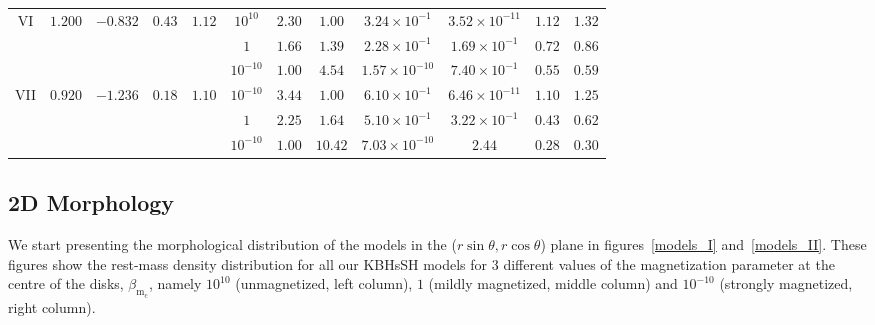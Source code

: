 \documentclass[twocolumn,aps,showpacs,showkeys,prd,superscriptaddress,byrevtex, amsmath]{revtex4-1}
\begin{document}
\begin{table}[t]
\begin{tabular}{c c c c c  c c c c c c c}
VI & $1.200$ & $-0.832$ & $0.43$ & $1.12$ & $10^{10}$ & $2.30$ & $1.00$ & $3.24 \times 10^{-1}$ & $3.52 \times 10^{-11}$ & $1.12$ & $1.32$ \\ 

 &  &  &  &  & $1$ & $1.66$ & $1.39$ & $2.28 \times 10^{-1}$ & $1.69\times 10^{-1}$ & $0.72$ & $0.86$ \\ 

 &  &  &  &  & $10^{-10}$ & $1.00$ & $4.54$ & $1.57 \times 10^{-10}$ & $7.40\times 10^{-1}$ & $0.55$ & $0.59$ \\ 
 
VII & $0.920$ & $-1.236$ & $0.18$ & $1.10$ & $10^{-10}$ & $3.44$ & $1.00$ & $6.10 \times 10^{-1}$ & $6.46 \times 10^{-11}$ & $1.10$ & $1.25$ \\ 

 &  &  &  &  & $1$ & $2.25$ & $1.64$ & $5.10 \times 10^{-1}$ & $3.22\times 10^{-1}$ & $0.43$ & $0.62$\\ 

 &  &  &  &  & $10^{-10}$ & $1.00$ & $10.42$ & $7.03 \times 10^{-10}$ & $2.44$ & $0.28$ & $0.30$\\ 
\hline\hline
\end{tabular}
\end{table}

\subsection{2D Morphology}

We start presenting the morphological distribution of the models in the ($r\sin\theta, r\cos\theta$) plane in figures~\ref{models_I} and~\ref{models_II}. These figures show the rest-mass density distribution for all our KBHsSH models for 3 different values of the magnetization parameter at the centre of the disks, $\beta_{\mathrm{m_c}}$, namely $10^{10}$ (unmagnetized, left column), $1$ (mildly magnetized, middle column) and $10^{-10}$ (strongly magnetized, right column). 
\end{document}
